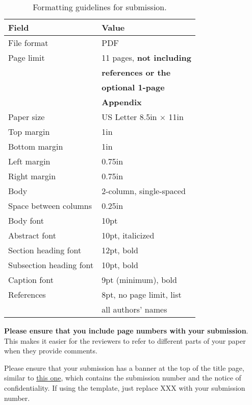 \documentclass{sig-alternate}
\begin{document}
\begin{scriptsize}
\begin{table}[h!]
  \centering
  \begin{tabular}{|l|l|}
    \hline
    \textbf{Field} & \textbf{Value}\\
    \hline
    \hline
    File format & PDF \\
    \hline
    Page limit & 11 pages, {\bf not including}\\
               & {\bf references or the}\\
               & {\bf optional 1-page }\\
               & {\bf Appendix}\\
    \hline
    Paper size & US Letter 8.5in $\times$ 11in\\
    \hline
    Top margin & 1in\\
    \hline
    Bottom margin & 1in\\
    \hline
    Left margin & 0.75in\\
    \hline
    Right margin & 0.75in\\
    \hline
    Body & 2-column, single-spaced\\
    \hline
    Space between columns & 0.25in\\
    \hline
    Body font & 10pt\\
    \hline
    Abstract font & 10pt, italicized\\
    \hline
    Section heading font & 12pt, bold\\
    \hline
    Subsection heading font & 10pt, bold\\
    \hline
    Caption font & 9pt (minimum), bold\\
    \hline
    References & 8pt, no page limit, list \\
               & all authors' names\\
    \hline
  \end{tabular}
  \caption{Formatting guidelines for submission. }
  \label{table:formatting}
\end{table}
\end{scriptsize}

\textbf{Please ensure that you include page numbers with your
submission}. This makes it easier for the reviewers to refer to different
parts of your paper when they provide comments.

Please ensure that your submission has a banner at the top of the
title page, similar to
\href{http://hpca2018.ece.ucsb.edu/docs/hpca24.pdf}{this one},
which contains the submission number and the notice of
confidentiality.  If using the template, just replace XXX with your
submission number.
\end{document}
